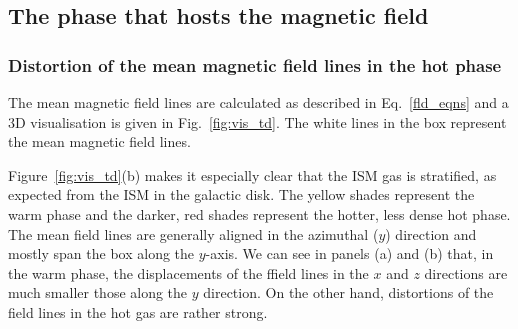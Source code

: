 \documentclass[useAMS,usenatbib]{mn2e}
\begin{document}
\subsection{The phase that hosts the magnetic field}
\subsubsection{Distortion of the mean magnetic field lines in the hot phase}
The mean magnetic field lines are calculated as described in Eq.~\eqref{fld_eqns} and a $3$D visualisation is given in Fig.~\ref{fig:vis_td}. The white lines in the box represent the mean magnetic field lines. 

Figure~\ref{fig:vis_td}(b) makes it especially clear that the ISM gas is stratified, as expected from the ISM in the galactic disk. The yellow shades represent the warm phase and the darker, red shades represent the hotter, less dense hot phase. The mean field lines are generally aligned in the azimuthal ($y$) direction and mostly span the box along the $y$-axis. We can see in panels (a) and (b) that, in the warm phase, the displacements of the ffield lines in the $x$ and $z$ directions are much smaller those along the $y$ direction. On the other hand, distortions of the field lines in the hot gas are rather strong.  
\end{document}

